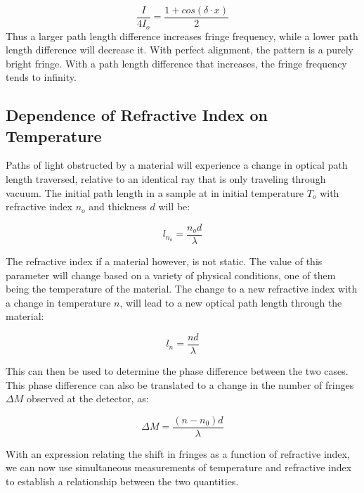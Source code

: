 \documentclass{article}
\begin{document}
\begin{equation}
	 \dfrac{I}{4I_o} =  \dfrac{1 + cos(\delta\cdot{x})}{2}
\end{equation}
Thus a larger path length difference increases fringe frequency, while a lower path length difference will decrease it. With perfect alignment,
the pattern is a purely bright fringe. With a path length difference that increases, the fringe frequency tends to infinity.
\subsection{  Dependence of Refractive Index on Temperature }\label{sec:dependence_of_refractive_index_on_temperature }\label{subsec:_dependence_of_refractive_index_on_temperature_}\label{sec:dependence_of_refractive_index_on_temperature}
Paths of light obstructed by a material will experience a change in optical path length traversed, relative to an identical ray that is only traveling through vacuum.
The initial path length in a sample at in initial temperature $T_o$ with refractive index $n_o$ and thickness $d$ will be\cite[pg. 465]{flores2002}:

\begin{equation}
    l_{n_o} = \dfrac{n_o d}{\lambda}
\end{equation}

The refractive index if a material however, is not static. The value of this parameter will change based on a variety of physical conditions, one of them being the temperature of the material. The change to a new refractive index with a change in temperature $n$, will lead to a new optical path length through the material:

\begin{equation}
    l_{n} = \dfrac{n d}{\lambda}
\end{equation}

This can then be used to determine the phase difference between the two cases. This phase difference can also be translated to a change in the number of
fringes $\Delta{M}$ observed at the detector, as\cite[pg. 465]{flores2002}:

\begin{equation}
    \Delta{M} = \dfrac{(n - n_0)d}{\lambda}
\end{equation}

With an expression relating the shift in fringes as a function of refractive index,
we can now use simultaneous measurements of temperature and refractive index
to establish a relationship between the two quantities.
\end{document}
